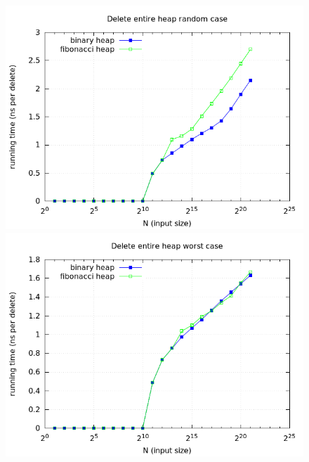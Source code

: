 \documentclass[a4paper,oneside,article,11pt]{memoir}
\begin{document}
\begin{figure}[H]
\centering
\begin{minipage}{0.48\columnwidth}
  \centering
  \includegraphics[width=\linewidth]{../res/delmin/delmin_del_all_time_random.png}%
  \caption{}
  \label{fig:delmin_all_random_time}
\end{minipage}%
\hfill
\begin{minipage}{0.48\columnwidth}
  \centering
  \includegraphics[width=\linewidth]{../res/delmin/delmin_del_all_time_worst.png}%
  \caption{}
  \label{fig:delmin_all_worst_time}
\end{minipage}
\end{figure}
\end{document}

